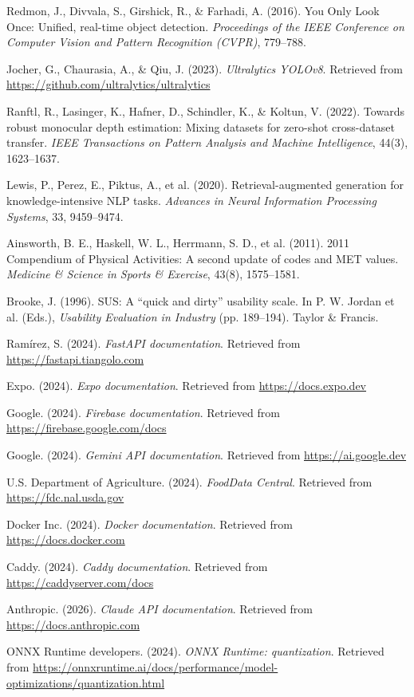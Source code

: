 
Redmon, J., Divvala, S., Girshick, R., \& Farhadi, A. (2016). You Only Look Once: Unified, real-time object detection. \textit{Proceedings of the IEEE Conference on Computer Vision and Pattern Recognition (CVPR)}, 779--788.

Jocher, G., Chaurasia, A., \& Qiu, J. (2023). \textit{Ultralytics YOLOv8}. Retrieved from \url{https://github.com/ultralytics/ultralytics}

Ranftl, R., Lasinger, K., Hafner, D., Schindler, K., \& Koltun, V. (2022). Towards robust monocular depth estimation: Mixing datasets for zero-shot cross-dataset transfer. \textit{IEEE Transactions on Pattern Analysis and Machine Intelligence}, 44(3), 1623--1637.

Lewis, P., Perez, E., Piktus, A., et al. (2020). Retrieval-augmented generation for knowledge-intensive NLP tasks. \textit{Advances in Neural Information Processing Systems}, 33, 9459--9474.

Ainsworth, B. E., Haskell, W. L., Herrmann, S. D., et al. (2011). 2011 Compendium of Physical Activities: A second update of codes and MET values. \textit{Medicine \& Science in Sports \& Exercise}, 43(8), 1575--1581.

Brooke, J. (1996). SUS: A ``quick and dirty'' usability scale. In P. W. Jordan et al. (Eds.), \textit{Usability Evaluation in Industry} (pp. 189--194). Taylor \& Francis.

Ram\'irez, S. (2024). \textit{FastAPI documentation}. Retrieved from \url{https://fastapi.tiangolo.com}

Expo. (2024). \textit{Expo documentation}. Retrieved from \url{https://docs.expo.dev}

Google. (2024). \textit{Firebase documentation}. Retrieved from \url{https://firebase.google.com/docs}

Google. (2024). \textit{Gemini API documentation}. Retrieved from \url{https://ai.google.dev}

U.S. Department of Agriculture. (2024). \textit{FoodData Central}. Retrieved from \url{https://fdc.nal.usda.gov}

Docker Inc. (2024). \textit{Docker documentation}. Retrieved from \url{https://docs.docker.com}

Caddy. (2024). \textit{Caddy documentation}. Retrieved from \url{https://caddyserver.com/docs}

Anthropic. (2026). \textit{Claude API documentation}. Retrieved from \url{https://docs.anthropic.com}

ONNX Runtime developers. (2024). \textit{ONNX Runtime: quantization}. Retrieved from \url{https://onnxruntime.ai/docs/performance/model-optimizations/quantization.html}
